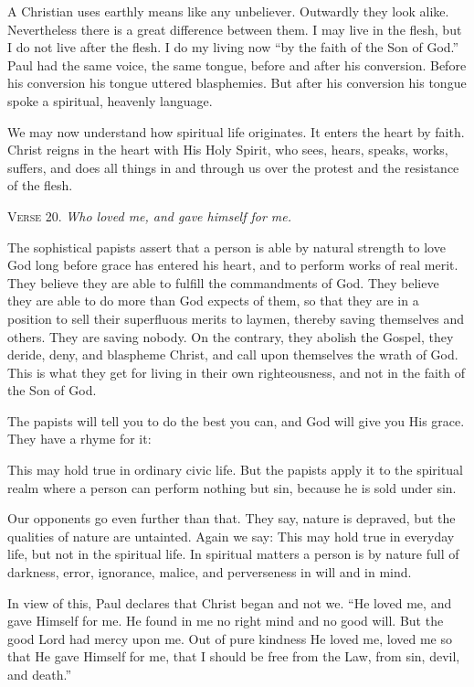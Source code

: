 A Christian uses earthly means like any unbeliever. Outwardly they look alike. Nevertheless there is a great difference between them. I may live in the flesh, but I do not live after the flesh. I do my living now “by the faith of the Son of God.” Paul had the same voice, the same tongue, before and after his conversion. Before his conversion his tongue uttered blasphemies. But after his conversion his tongue spoke a spiritual, heavenly language.

We may now understand how spiritual life originates. It enters the heart by faith. Christ reigns in the heart with His Holy Spirit, who sees, hears, speaks, works, suffers, and does all things in and through us over the protest and the resistance of the flesh.

\textsc{Verse} 20. \emph{Who loved me, and gave himself for me.}

The sophistical papists assert that a person is able by natural strength to love God long before grace has entered his heart, and to perform works of real merit. They believe they are able to fulfill the commandments of God. They believe they are able to do more than God expects of them, so that they are in a position to sell their superfluous merits to laymen, thereby saving themselves and others. They are saving nobody. On the contrary, they abolish the Gospel, they deride, deny, and blaspheme Christ, and call upon themselves the wrath of God. This is what they get for living in their own righteousness, and not in the faith of the Son of God.

The papists will tell you to do the best you can, and God will give you His grace. They have a rhyme for it:

This may hold true in ordinary civic life. But the papists apply it to the spiritual realm where a person can perform nothing but sin, because he is sold under sin.

Our opponents go even further than that. They say, nature is depraved, but the qualities of nature are untainted. Again we say: This may hold true in everyday life, but not in the spiritual life. In spiritual matters a person is by nature full of darkness, error, ignorance, malice, and perverseness in will and in mind.

In view of this, Paul declares that Christ began and not we. “He loved me, and gave Himself for me. He found in me no right mind and no good will. But the good Lord had mercy upon me. Out of pure kindness He loved me, loved me so that He gave Himself for me, that I should be free from the Law, from sin, devil, and death.”

